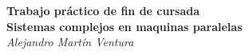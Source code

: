 \documentclass[12pt, a4paper,english,spanish]{amsart}
\begin{document}
\makeatletter
\preto{\@verbatim}{\topsep=0pt \partopsep=0pt }
\makeatother

\begin{center}
~\\
~\\
~\\
~\\
~\\
~\\
~\\
~\\
~\\
~\\
~\\
~\\
   \Large\textbf{Trabajo práctico de fin de cursada}\\
   \Large\textbf{Sistemas complejos en maquinas paralelas}\\
   \large\textit{Alejandro Martín Ventura}\\
\end{center}
\newpage


\newpage



\newpage

\newpage

\newpage

\end{document}
